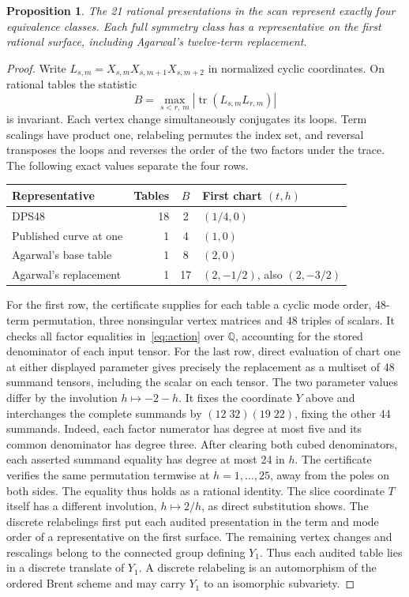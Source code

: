 \documentclass[11pt,reqno]{amsart}
\newcommand{\Q}{\mathbb Q}
\newcommand{\tr}{\operatorname{tr}}
\newtheorem{proposition}[theorem]{Proposition}
\begin{document}
\begin{proposition}
The 21 rational presentations in the scan represent exactly four equivalence classes. Each full symmetry class has a representative on the first rational surface, including Agarwal's twelve-term replacement.
\end{proposition}
\begin{proof}
Write \(L_{s,m}=X_{s,m}X_{s,m+1}X_{s,m+2}\) in normalized cyclic coordinates. On rational tables the statistic
\[
 B=\max_{s<r,\,m}\left|\tr(L_{s,m}L_{r,m})\right|
\]
is invariant. Each vertex change simultaneously conjugates its loops. Term scalings have product one, relabeling permutes the index set, and reversal transposes the loops and reverses the order of the two factors under the trace. The following exact values separate the four rows.
\begin{center}
\small
\begin{tabular}{@{}lrcl@{}}
\toprule
Representative & Tables & \(B\) & First chart \((t,h)\)\\
\midrule
DPS48 & 18 & 2 & \((1/4,0)\)\\
Published curve at one & 1 & 4 & \((1,0)\)\\
Agarwal's base table & 1 & 8 & \((2,0)\)\\
Agarwal's replacement & 1 & 17 & \((2,-1/2)\), also \((2,-3/2)\)\\
\bottomrule
\end{tabular}
\end{center}
For the first row, the certificate supplies for each table a cyclic mode order, 48-term permutation, three nonsingular vertex matrices and 48 triples of scalars. It checks all factor equalities in~\eqref{eq:action} over \(\Q\), accounting for the stored denominator of each input tensor. For the last row, direct evaluation of chart one at either displayed parameter gives precisely the replacement as a multiset of 48 summand tensors, including the scalar on each tensor. The two parameter values differ by the involution \(h\mapsto-2-h\). It fixes the coordinate \(Y\) above and interchanges the complete summands by \((12\;32)(19\;22)\), fixing the other 44 summands. Indeed, each factor numerator has degree at most five and its common denominator has degree three. After clearing both cubed denominators, each asserted summand equality has degree at most 24 in \(h\). The certificate verifies the same permutation termwise at \(h=1,\ldots,25\), away from the poles on both sides. The equality thus holds as a rational identity. The slice coordinate \(T\) itself has a different involution, \(h\mapsto 2/h\), as direct substitution shows. The discrete relabelings first put each audited presentation in the term and mode order of a representative on the first surface. The remaining vertex changes and rescalings belong to the connected group defining \(Y_1\). Thus each audited table lies in a discrete translate of \(Y_1\). A discrete relabeling is an automorphism of the ordered Brent scheme and may carry \(Y_1\) to an isomorphic subvariety.
\end{proof}
\end{document}
